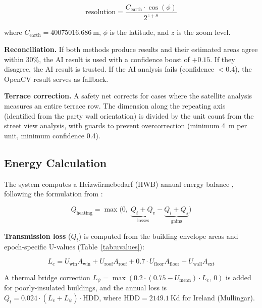 \documentclass[preprint,12pt,authoryear]{elsarticle}
\begin{document}
\begin{equation}
  \text{resolution} = \frac{C_{\text{earth}} \cdot \cos(\phi)}{2^{z+8}}
  \label{eq:mpp}
\end{equation}

\noindent where $C_{\text{earth}} = \SI{40075016.686}{\metre}$, $\phi$ is the latitude, and $z$ is the zoom level.

\textbf{Reconciliation.} If both methods produce results and their estimated areas agree within 30\%, the AI result is used with a confidence boost of $+0.15$. If they disagree, the AI result is trusted. If the AI analysis fails (confidence $< 0.4$), the OpenCV result serves as fallback.

\textbf{Terrace correction.} A safety net corrects for cases where the satellite analysis measures an entire terrace row. The dimension along the repeating axis (identified from the party wall orientation) is divided by the unit count from the street view analysis, with guards to prevent overcorrection (minimum \SI{4}{\metre} per unit, minimum confidence 0.4).

\subsection{Energy Calculation}

The system computes a Heizw\"armebedarf (HWB) annual energy balance \citep{hwb_leitfaden_2019}, following the formulation from \citet{kaiser_excel_2025}:

\begin{equation}
  Q_{\text{heating}} = \max\!\Big(0,\; \underbrace{Q_t + Q_v}_{\text{losses}} - \underbrace{Q_i + Q_s}_{\text{gains}}\Big)
  \label{eq:hwb}
\end{equation}

\textbf{Transmission loss} ($Q_t$) is computed from the building envelope areas and epoch-specific U-values (Table~\ref{tab:uvalues}):

\begin{equation}
  L_e = U_{\text{win}} A_{\text{win}} + U_{\text{roof}} A_{\text{roof}} + 0.7 \cdot U_{\text{floor}} A_{\text{floor}} + U_{\text{wall}} A_{\text{ext}}
\end{equation}

\noindent A thermal bridge correction $L_\psi = \max(0.2 \cdot (0.75 - U_{\text{mean}}) \cdot L_e,\, 0)$ is added for poorly-insulated buildings, and the annual loss is $Q_t = 0.024 \cdot (L_e + L_\psi) \cdot \text{HDD}$, where $\text{HDD} = \SI{2149.1}{\kelvin\day}$ for Ireland (Mullingar).
\end{document}
